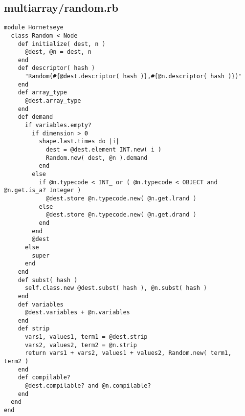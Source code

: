 \subsection{multiarray/random.rb}\label{cha:multiarray-random-rb}
\begin{lstlisting}
module Hornetseye
  class Random < Node
    def initialize( dest, n )
      @dest, @n = dest, n
    end
    def descriptor( hash )
      "Random(#{@dest.descriptor( hash )},#{@n.descriptor( hash )})"
    end
    def array_type
      @dest.array_type
    end
    def demand
      if variables.empty?
        if dimension > 0
          shape.last.times do |i|
            dest = @dest.element INT.new( i )
            Random.new( dest, @n ).demand
          end  
        else
          if @n.typecode < INT_ or ( @n.typecode < OBJECT and @n.get.is_a? Integer )
            @dest.store @n.typecode.new( @n.get.lrand )
          else
            @dest.store @n.typecode.new( @n.get.drand )
          end
        end
        @dest
      else
        super
      end
    end
    def subst( hash )
      self.class.new @dest.subst( hash ), @n.subst( hash )
    end
    def variables
      @dest.variables + @n.variables
    end
    def strip
      vars1, values1, term1 = @dest.strip
      vars2, values2, term2 = @n.strip
      return vars1 + vars2, values1 + values2, Random.new( term1, term2 )
    end
    def compilable?
      @dest.compilable? and @n.compilable?
    end
  end
end
\end{lstlisting}

